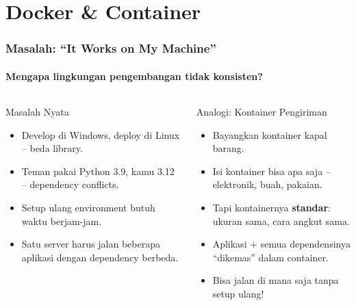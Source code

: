\documentclass[t,aspectratio=169,xcolor=dvipsnames]{beamer}
\begin{document}
\section{Docker \& Container}

\begin{frame}
    \frametitle{Masalah: ``It Works on My Machine''}
    \framesubtitle{Mengapa lingkungan pengembangan tidak konsisten?}

    \begin{columns}[T]
        \begin{alertblock}{Masalah Nyata}
            \small
            \begin{itemize}
                \item Develop di Windows, deploy di Linux -- beda library.
                \item Teman pakai Python 3.9, kamu 3.12 -- dependency conflicts.
                \item Setup ulang environment butuh waktu berjam-jam.
                \item Satu server harus jalan beberapa aplikasi dengan dependency berbeda.
            \end{itemize}
        \end{alertblock}

        \begin{exampleblock}{Analogi: Kontainer Pengiriman}
            \small
            \begin{itemize}
                \item Bayangkan kontainer kapal barang.
                \item Isi kontainer bisa apa saja -- elektronik, buah, pakaian.
                \item Tapi kontainernya \textbf{standar}: ukuran sama, cara angkut sama.
                \item Aplikasi + semua dependensinya ``dikemas'' dalam container.
                \item Bisa jalan di mana saja tanpa setup ulang!
            \end{itemize}
        \end{exampleblock}
    \end{columns}
\end{frame}
\end{document}

